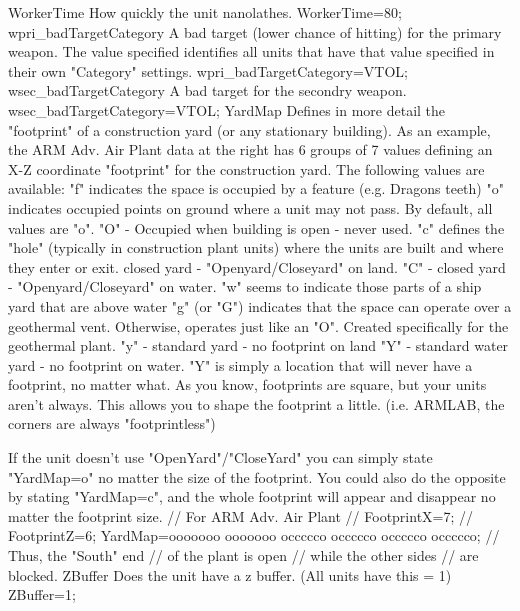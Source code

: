 \documentclass[a4paper,10pt]{article}
\begin{document}
WorkerTime 	How quickly the unit nanolathes. 	WorkerTime=80;
wpri\_badTargetCategory 	A bad target (lower chance of hitting) for the primary weapon.  The value specified identifies all units that have that value specified in their own "Category" settings. 	wpri\_badTargetCategory=VTOL;
wsec\_badTargetCategory 	A bad target for the secondry weapon. 	wsec\_badTargetCategory=VTOL;
YardMap 	Defines in more detail the "footprint" of a construction yard (or any stationary building).  As an example, the ARM Adv. Air Plant data at the right has 6 groups of 7 values defining an X-Z coordinate "footprint" for the construction yard.  The following values are available:
	"f" indicates the space is occupied by a feature (e.g. Dragons teeth)
	"o" indicates occupied points on ground where a unit may not pass.  By default, all values are "o".
	"O" - Occupied when building is open - never used.
	"c" defines the "hole" (typically in construction plant units) where the units are built and where they enter or exit.  closed yard - "Openyard/Closeyard" on land.
	"C" - closed yard - "Openyard/Closeyard" on water.
	"w" seems to indicate those parts of a ship yard that are above water
	"g" (or "G") indicates that the space can operate over a geothermal vent.   Otherwise, operates just like an "O".  Created specifically for the geothermal plant.
	"y" - standard yard - no footprint on land
	"Y" - standard water yard - no footprint on water.  "Y" is simply a location that will never have a footprint, no matter what.
As you know, footprints are square, but your units aren't always.
This allows you to shape the footprint a little.  (i.e. ARMLAB, the corners
are always "footprintless")

If the unit doesn't use "OpenYard"/"CloseYard" you can simply state "YardMap=o" no matter the size of the footprint.  You could also do the opposite by stating "YardMap=c", and the whole footprint will appear and disappear no matter the footprint size.
	// For ARM Adv. Air Plant
// FootprintX=7;
// FootprintZ=6;
YardMap=ooooooo ooooooo occccco occccco occccco occccco;
// Thus, the "South" end
// of the plant is open
// while the other sides
// are blocked.
ZBuffer 	Does the unit have a z buffer. (All units have this = 1) 	ZBuffer=1;
\end{document}
